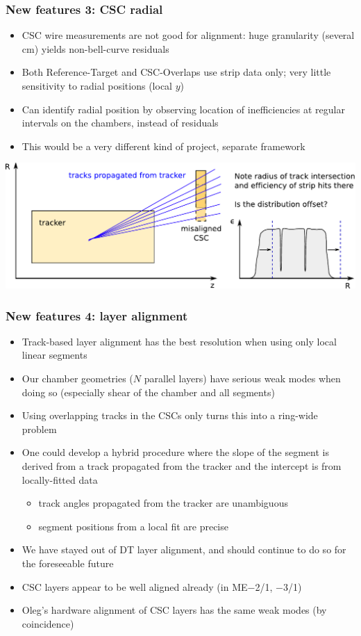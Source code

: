 \documentclass[compress]{beamer}
\begin{document}
\begin{frame}
\frametitle{New features 3: CSC radial}

\begin{itemize}
\item CSC wire measurements are not good for alignment: huge granularity (several cm) yields non-bell-curve residuals
\item Both Reference-Target and CSC-Overlaps use strip data only; very little sensitivity to radial positions (local $y$)
\item Can identify radial position by observing location of inefficiencies at regular intervals on the chambers, instead of residuals
\item This would be a very different kind of project, separate framework
\end{itemize}

\includegraphics[width=\linewidth]{way_to_find_radial_misalignment.pdf}
\end{frame}

\begin{frame}
\frametitle{New features 4: layer alignment}

\begin{itemize}
\item Track-based layer alignment has the best resolution when using only local linear segments
\item Our chamber geometries ($N$ parallel layers) have serious weak modes when doing so (especially shear of the chamber and all segments)
\item Using overlapping tracks in the CSCs only turns this into a ring-wide problem
\item One could develop a hybrid procedure where the slope of the
  segment is derived from a track propagated from the tracker and the
  intercept is from locally-fitted data
\begin{itemize}
\item track angles propagated from the tracker are unambiguous
\item segment positions from a local fit are precise
\end{itemize}
\item We have stayed out of DT layer alignment, and should continue to do so for the foreseeable future
\item CSC layers appear to be well aligned already (in ME$-$2/1, $-$3/1)
\item Oleg's hardware alignment of CSC layers has the same weak modes (by coincidence)
\end{itemize}
\end{frame}
\end{document}
